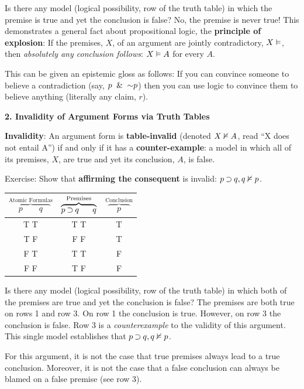 \documentclass[options]{philosophersimprint}
\theoremstyle{definition}
\begin{document}
Is there any model (logical possibility, row of the truth table) in which the premise is true and yet the conclusion is false? No, the premise is never true! This demonstrates a general fact about propositional logic, the \textbf{principle of explosion}: If the premises, $X$, of an argument are jointly contradictory, $X\vDash$, then \textit{absolutely any conclusion follows}: $X\vDash A$ for every $A$.

This can be given an epistemic gloss as follows: If you can convince someone to believe a contradiction (say, $p \ \mathbin{\&} \  \mathord{\sim} p$) then you can use logic to convince them to believe anything (literally any claim, $r$).

\textbf{2. Invalidity of Argument Forms via Truth Tables}

\textbf{Invalidity}: An argument form is \textbf{table-invalid} (denoted $X \nvDash A$, read ``X does not entail A'') if and only if it has a \textbf{counter-example}: a model in which all of its premises, $X$, are true and yet its conclusion, $A$, is false.

Exercise: Show that \textbf{affirming the consequent} is invalid: $p\mathbin{\supset} q, q \nvDash p$.

\begin{table}[h!]
    \centering
    \begin{tabular}{c | c | c}
        $\overbrace{\quad p \qquad q\quad}^\text{Atomic Formulas}$ & $\overbrace{p \mathbin{\supset} q \ \ \quad q}^\text{Premises}$ & $\overbrace{\quad p\quad}^\text{Conclusion}$\\
        \hline
        T \qquad T & \quad T \qquad T & T\\
        T \qquad F & \quad F \qquad F & T\\
        F \qquad T & \quad T \qquad T & F\\
        F \qquad F & \quad T \qquad F & F\\
    \end{tabular}
\end{table}

Is there any model (logical possibility, row of the truth table) in which both of the premises are true and yet the conclusion is false? The premises are both true on rows 1 and row 3. On row 1 the conclusion is true. However, on row 3 the conclusion is false. Row 3 is a \textit{counterexample} to the validity of this argument. This single model establishes that $p \mathbin{\supset} q, q \nvDash p$.

For this argument, it is not the case that true premises always lead to a true conclusion. Moreover, it is not the case that a false conclusion can always be blamed on a false premise (see row 3).
\end{document}
